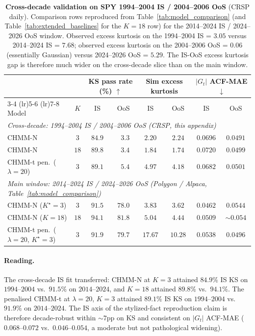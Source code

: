 \begin{table}[!ht]
\centering
\small
\caption{\textbf{Cross-decade validation on SPY 1994--2004 IS / 2004--2006 OoS} (CRSP daily). Comparison rows reproduced from Table~\ref{tab:model_comparison} (and Table~\ref{tab:extended_baselines} for the $K = 18$ row) for the 2014--2024 IS / 2024--2026 OoS window. Observed excess kurtosis on the 1994--2004 IS = $3.05$ versus 2014--2024 IS = $7.68$; observed excess kurtosis on the 2004--2006 OoS = $0.06$ (essentially Gaussian) versus 2024--2026 OoS = $5.29$. The IS-OoS excess kurtosis gap is therefore much wider on the cross-decade slice than on the main window.}
\label{tab:cross_decade_validation}
\begin{tabular}{l c c c c c c c}
\toprule
& & \multicolumn{2}{c}{KS pass rate (\%) $\uparrow$} & \multicolumn{2}{c}{Sim excess kurtosis} & \multicolumn{2}{c}{$|G_t|$ ACF-MAE $\downarrow$} \\
\cmidrule(lr){3-4} \cmidrule(lr){5-6} \cmidrule(lr){7-8}
Model & $K$ & IS & OoS & IS & OoS & IS & OoS \\
\midrule
\multicolumn{8}{l}{\emph{Cross-decade: 1994--2004 IS / 2004--2006 OoS (CRSP, this appendix)}} \\
CHMM-N                              & $3$  & $84.9$ & $\phantom{0}3.3$ & $2.20$ & $2.24$ & $0.0696$ & $0.0491$ \\
CHMM-N                              & $18$ & $89.8$ & $\phantom{0}3.4$ & $1.84$ & $1.74$ & $0.0720$ & $0.0499$ \\
CHMM-t pen.\ ($\lambda = 20$)       & $3$  & $89.1$ & $\phantom{0}5.4$ & $4.97$ & $4.18$ & $0.0682$ & $0.0501$ \\
\midrule
\multicolumn{8}{l}{\emph{Main window: 2014--2024 IS / 2024--2026 OoS (Polygon / Alpaca, Table~\ref{tab:model_comparison})}} \\
CHMM-N ($K^\star = 3$)              & $3$  & $91.5$ & $78.0$ & $3.83$ & $3.62$ & $0.0462$ & $0.0544$ \\
CHMM-N ($K = 18$)                   & $18$ & $94.1$ & $81.8$ & $5.04$ & $4.44$ & $0.0509$ & $\sim 0.054$ \\
CHMM-t pen.\ ($\lambda = 20$, $K^\star = 3$)  & $3$  & $91.9$ & $79.7$ & $17.67$ & $10.28$ & $0.0538$ & $0.0496$ \\
\bottomrule
\end{tabular}
\end{table}

\paragraph{Reading.}
The cross-decade IS fit transferred: CHMM-N at $K = 3$ attained $84.9\%$ IS KS on $1994$--$2004$ vs.\ $91.5\%$ on $2014$--$2024$, and $K = 18$ attained $89.8\%$ vs.\ $94.1\%$. The penalised CHMM-t at $\lambda = 20$, $K = 3$ attained $89.1\%$ IS KS on $1994$--$2004$ vs.\ $91.9\%$ on $2014$--$2024$. The IS axis of the stylized-fact reproduction claim is therefore decade-robust within $\sim 7$pp on KS and consistent on $|G_t|$ ACF-MAE ($0.068$--$0.072$ vs.\ $0.046$--$0.054$, a moderate but not pathological widening).

